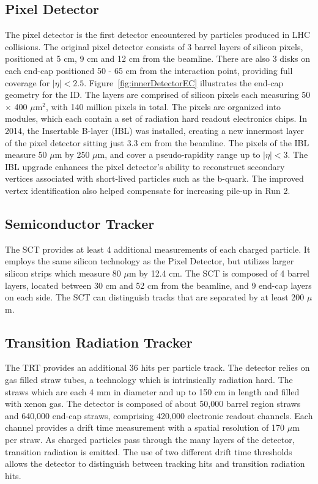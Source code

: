 \subsection{Pixel Detector}
The pixel detector is the first detector encountered by particles produced in LHC collisions. The original pixel detector consists of 3 barrel layers of silicon pixels, positioned at 5 cm, 9 cm and 12 cm from the beamline. There are also 3 disks on each end-cap positioned 50 - 65 cm from the interaction point, providing full coverage for $|\eta| < 2.5$.  Figure~\ref{fig:innerDetectorEC} illustrates the end-cap geometry for the ID. The layers are comprised of silicon pixels each measuring 50 $\times$ 400 $\mu$m$^2$, with 140 million pixels in total. The pixels are organized into modules, which each contain a set of radiation hard readout electronics chips. In 2014, the Insertable B-layer (IBL) was installed, creating a new innermost layer of the pixel detector sitting just 3.3 cm from the beamline. The pixels of the IBL measure 50 $\mu$m by 250 $\mu$m, and cover a pseudo-rapidity range up to $|\eta| < 3$. The IBL upgrade enhances the pixel detector's ability to reconstruct secondary vertices associated with short-lived particles such as the b-quark. The improved vertex identification also helped compensate for increasing pile-up in Run 2. 

\subsection{Semiconductor Tracker}
The SCT provides at least 4 additional measurements of each charged particle. It employs the same silicon technology as the Pixel Detector, but utilizes larger silicon strips which measure 80 $\mu$m by 12.4 cm. The SCT is composed of 4 barrel layers, located between 30 cm and 52 cm from the beamline, and 9 end-cap layers on each side. The SCT can distinguish tracks that are separated by at least 200 $\mu$m.

\subsection{Transition Radiation Tracker}
The TRT provides an additional 36 hits per particle track. The detector relies on gas filled straw tubes, a technology which is intrinsically radiation hard. The straws which are each 4 mm in diameter and up to 150 cm in length and filled with xenon gas. The detector is composed of about 50,000 barrel region straws and 640,000 end-cap straws, comprising 420,000 electronic readout channels. Each channel provides a drift time measurement with a spatial resolution of 170 $\mu$m per straw. As charged particles pass through the many layers of the detector, transition radiation is emitted. The use of two different drift time thresholds allows the detector to distinguish between tracking hits and transition radiation hits. 

